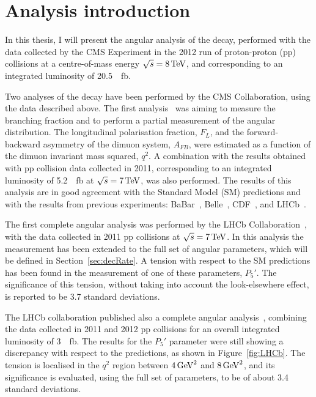 \chapter{Analysis introduction}
\label{sec:theo}

In this thesis, I will present the angular analysis of the \BtoKstmumu decay, performed with the data collected by the CMS Experiment in the 2012 run of proton-proton (pp) collisions at a centre-of-mass energy $\sqrt{s}=8\,\textrm{TeV}$, and corresponding to an integrated luminosity of \SI{20.5}{\per\femto\barn}.

Two analyses of the \BtoKstmumu decay have been performed by the CMS Collaboration, using the data described above.
The first analysis~\cite{CMS:2012} was aiming to measure the branching fraction and to perform a partial measurement of the angular distribution.
The \Ks longitudinal polarisation fraction, $F_L$, and the forward-backward asymmetry of the dimuon system, $A_{FB}$, were estimated as a function of the dimuon invariant mass squared, $q^2$.
A combination with the results obtained with pp collision data collected in 2011, corresponding to an integrated luminosity of \SI{5.2}{\per\femto\barn} at $\sqrt{s}=7\,\textrm{TeV}$, was also performed.
The results of this analysis are in good agreement with the Standard Model (SM) predictions and with the results from previous experiments: BaBar~\cite{Aubert:2008bi}, Belle~\cite{Wei:2009zv}, CDF~\cite{Aaltonen:2011ja}, and LHCb~\cite{Aaij:2013iag}.

The first complete angular analysis was performed by the LHCb Collaboration~\cite{Aaij:2013qta}, with the data collected in 2011 pp collisions at $\sqrt{s}=7\,\textrm{TeV}$.
In this analysis the measurement has been extended to the full set of angular parameters, which will be defined in Section~\ref{sec:decRate}.
A tension with respect to the SM predictions has been found in the measurement of one of these parameters, $P_5'$.
The significance of this tension, without taking into account the look-elsewhere effect, is reported to be 3.7 standard deviations.

The LHCb collaboration published also a complete angular analysis~\cite{Aaij:2015oid}, combining the data collected in 2011 and 2012 pp collisions for an overall integrated luminosity of \SI{3}{\per\femto\barn}.
The results for the $P_5'$ parameter were still showing a discrepancy with respect to the predictions, as shown in Figure~\ref{fig:LHCb}.
The tension is localised in the $q^2$ region between $4\,\textrm{GeV}^2$ and $8\,\textrm{GeV}^2$, and its significance is evaluated, using the full set of parameters, to be of about 3.4 standard deviations.

